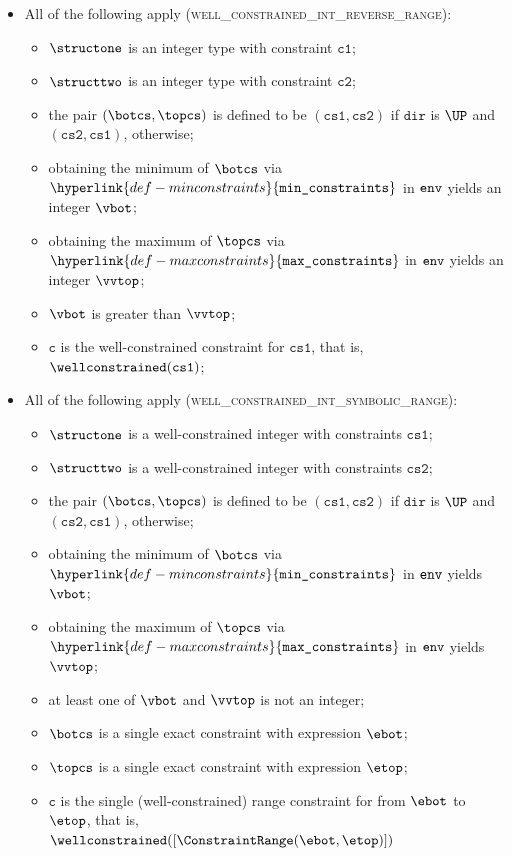 \documentclass{book}
\newcommand\minconstraints[0]{\hyperlink{def-minconstraints}{\texttt{min\_constraints}}}
\newcommand\maxconstraints[0]{\hyperlink{def-maxconstraints}{\texttt{max\_constraints}}}
\newcommand\vc[0]{\texttt{c}}
\newcommand\vcone[0]{\texttt{c1}}
\newcommand\vctwo[0]{\texttt{c2}}
\newcommand\dir[0]{\texttt{dir}}
\newcommand\csone[0]{\texttt{cs1}}
\newcommand\cstwo[0]{\texttt{cs2}}
\begin{document}
\begin{itemize}
  \item All of the following apply (\textsc{well\_constrained\_int\_reverse\_range}):
  \begin{itemize}
    \item $\structone$ is an integer type with constraint $\vcone$;
    \item $\structtwo$ is an integer type with constraint $\vctwo$;
    \item the pair $(\botcs, \topcs)$ is defined to be $(\csone, \cstwo)$ if $\dir$ is $\UP$ and $(\cstwo, \csone)$, otherwise;
    \item obtaining the minimum of $\botcs$ via $\minconstraints$ in $\texttt{env}$ yields an integer $\vbot$;
    \item obtaining the maximum of $\topcs$ via $\maxconstraints$ in $\texttt{env}$ yields an integer $\vvtop$;
    \item $\vbot$ is greater than $\vvtop$;
    \item $\vc$ is the well-constrained constraint for $\csone$, that is, \\
          $\wellconstrained(\csone)$;
  \end{itemize}

  \item All of the following apply (\textsc{well\_constrained\_int\_symbolic\_range}):
  \begin{itemize}
    \item $\structone$ is a well-constrained integer with constraints $\csone$;
    \item $\structtwo$ is a well-constrained integer with constraints $\cstwo$;
    \item the pair $(\botcs, \topcs)$ is defined to be $(\csone, \cstwo)$ if $\dir$ is $\UP$ and $(\cstwo, \csone)$, otherwise;
    \item obtaining the minimum of $\botcs$ via $\minconstraints$ in $\texttt{env}$ yields $\vbot$;
    \item obtaining the maximum of $\topcs$ via $\maxconstraints$ in $\texttt{env}$ yields $\vvtop$;
    \item at least one of $\vbot$ and $\vvtop$ is not an integer;
    \item $\botcs$ is a single exact constraint with expression $\ebot$;
    \item $\topcs$ is a single exact constraint with expression $\etop$;
    \item $\vc$ is the single (well-constrained) range constraint for from $\ebot$ to $\etop$, that is, \\
          $\wellconstrained([\ConstraintRange(\ebot, \etop)])$
  \end{itemize}


\end{itemize}
\end{document}
